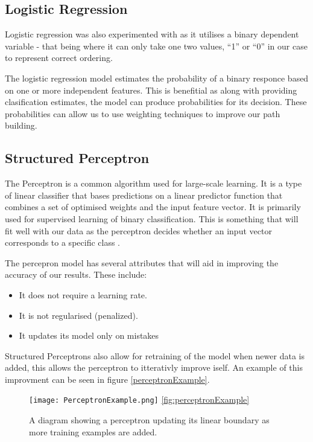 \documentclass[bsc,frontabs,twoside,singlespacing,parskip,deptreport]{infthesis}     %
\begin{document}
\subsection{Logistic Regression}
Logistic regression was also experimented with as it utilises a binary dependent variable - that being where it
can only take one two values, ``1'' or ``0'' in our case to represent correct ordering.


The logistic regression model estimates the probability of a binary responce based on one or more independent features.
This is benefitial as along with providing clasification estimates, the model can produce probabilities for its
decision. These probabilities can allow us to use weighting techniques to improve our path building.

\subsection{Structured Perceptron}
The Perceptron is a common algorithm used for large-scale learning.
It is a type of linear classifier that bases predictions on a linear predictor function that combines a set of optimised weights
and the input feature vector.
It is primarily used for supervised learning of binary classification.
This is something that will fit well with our data as the perceptron decides whether an input vector
corresponds to a specific class \cite{freund1999large}.

The percepron model has several attributes that will aid in improving the accuracy of our results.
These include:
\begin{itemize}
\item It does not require a learning rate.
\item It is not regularised (penalized).
\item It updates its model only on mistakes
\end{itemize}

Structured Perceptrons also allow for retraining of the model when newer data is added, this allows the perceptron to
itterativly improve iself. An example of this improvment can be seen in figure \ref{perceptronExample}.
\begin{figure}[ht]
  \centering
  \texttt{[image: PerceptronExample.png]}
  \ref{fig:perceptronExample}
  \caption{A diagram showing a perceptron updating its linear boundary as more training examples are added. }
\end{figure}
\end{document}
